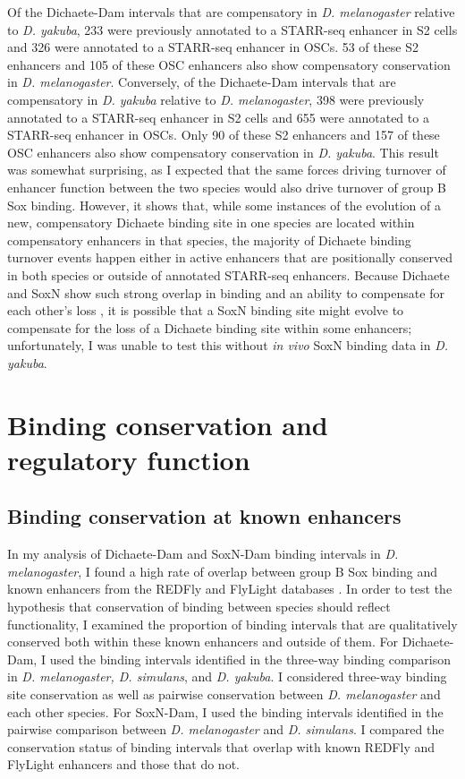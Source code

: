 Of the Dichaete-Dam intervals that are compensatory in \emph{D. melanogaster} relative to \emph{D. yakuba}, 233 were previously annotated to a STARR-seq enhancer in S2 cells and 326 were annotated to a STARR-seq enhancer in OSCs. 53 of these S2 enhancers and 105 of these OSC enhancers also show compensatory conservation in \emph{D. melanogaster}. Conversely, of the Dichaete-Dam intervals that are compensatory in \emph{D. yakuba} relative to \emph{D. melanogaster}, 398 were previously annotated to a STARR-seq enhancer in S2 cells and 655 were annotated to a STARR-seq enhancer in OSCs. Only 90 of these S2 enhancers and 157 of these OSC enhancers also show compensatory conservation in \emph{D. yakuba}. This result was somewhat surprising, as I expected that the same forces driving turnover of enhancer function between the two species would also drive turnover of group B Sox binding. However, it shows that, while some instances of the evolution of a new, compensatory Dichaete binding site in one species are located within compensatory enhancers in that species, the majority of Dichaete binding turnover events happen either in active enhancers that are positionally conserved in both species or outside of annotated STARR-seq enhancers. Because Dichaete and SoxN show such strong overlap in binding and an ability to compensate for each other’s loss \citep{ferrero_soxneuro_2014}, it is possible that a SoxN binding site might evolve to compensate for the loss of a Dichaete binding site within some enhancers; unfortunately, I was unable to test this without \emph{in vivo} SoxN binding data in \emph{D. yakuba}.\\
 
\section{Binding conservation and regulatory function}
\subsection{Binding conservation at known enhancers}
In my analysis of Dichaete-Dam and SoxN-Dam binding intervals in \emph{D. melanogaster}, I found a high rate of overlap between group B Sox binding and known enhancers from the REDFly and FlyLight databases \citep{gallo_redfly_2010,manning_resource_2012}. In order to test the hypothesis that conservation of binding between species should reflect functionality, I examined the proportion of binding intervals that are qualitatively conserved both within these known enhancers and outside of them. For Dichaete-Dam, I used the binding intervals identified in the three-way binding comparison in \emph{D. melanogaster, D. simulans}, and \emph{D. yakuba}. I considered three-way binding site conservation as well as pairwise conservation between \emph{D. melanogaster} and each other species. For SoxN-Dam, I used the binding intervals identified in the pairwise comparison between \emph{D. melanogaster} and \emph{D. simulans}. I compared the conservation status of binding intervals that overlap with known REDFly and FlyLight enhancers and those that do not.\\

